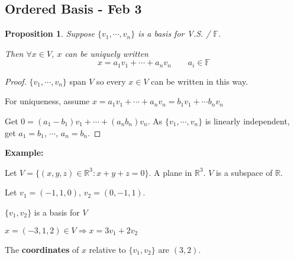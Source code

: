 \documentclass[12pt]{article}
\theoremstyle{plain}
\newtheorem{proposition}{Proposition}[subsection]
\newcommand{\mR}{{\mathbb{R}}}
\newcommand{\mF}{{\mathbb{F}}}
\begin{document}
%
%
%




	\newpage
	\subsection{Ordered Basis - Feb 3}
	\begin{proposition}
		Suppose $\{v_1, \cdots, v_n\}$ is a basis for V.S. / $\mF$. 

		Then $\forall x \in V$, $x$ can be uniquely written 
		\[
			x = a_1v_1 + \cdots + a_nv_n \qquad a_i \in \mF
		\]
	\end{proposition}
	\begin{proof}
		$\{v_1, \cdots, v_n\}$ span $V$ so every $x \in V$ can be written in 
		this way. 

		For uniqueness, assume $x = a_1v_1 + \cdots + a_nv_n = 
		b_1v_1+\cdots b_nv_n$

		Get $0 = (a_1-b_1)v_1+\cdots+(a_nb_n)v_n$. As $\{v_1,\cdots, v_n\}$
		is linearly independent, get $a_1 = b_1$, $\cdots$, $a_n=b_n$. 
	\end{proof}

	{\color{Brown}
	\textbf{Example: }

	Let $V = \{(x,y,z) \in \mR^3 : x + y + z = 0\}$. A plane in $\mR^3$. 
	$V$ is a subspace of $\mR$. 

	Let $v_1 = (-1,1,0)$, $v_2 = (0, -1 ,1)$. 

	$\{v_1, v_2\}$ is a basis for $V$
	
	$x = (-3,1,2) \in V \Rightarrow x = 3v_1 + 2v_2$ 
	
	The \textbf{coordinates} of $x$ relative to $\{v_1, v_2\}$ are $(3,2)$.\\
	}
\end{document}
